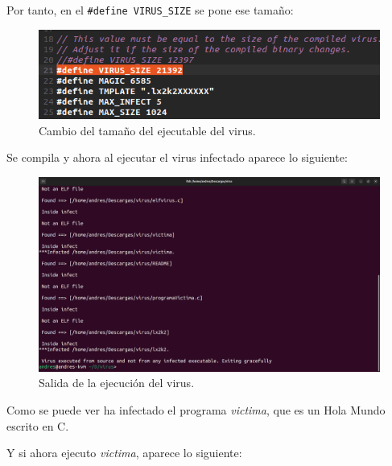\documentclass{article}
\begin{document}
\newpage

Por tanto, en el \verb|#define VIRUS_SIZE| se pone ese tamaño:

\begin{figure}[H]
    \includegraphics[width=\textwidth]{imagenes/Captura desde 2022-11-23 12-29-27.png}
    \caption{Cambio del tamaño del ejecutable del virus.}
\end{figure}

\bigskip

Se compila y ahora al ejecutar el virus infectado aparece lo siguiente:

\begin{figure}[H]
    \includegraphics[width=\textwidth]{imagenes/Captura desde 2022-11-23 12-32-53.png}
    \caption{Salida de la ejecución del virus.}
\end{figure}

Como se puede ver ha infectado el programa \textit{victima}, que es un Hola Mundo escrito en C.

\newpage

Y si ahora ejecuto \textit{victima}, aparece lo siguiente:
\end{document}
